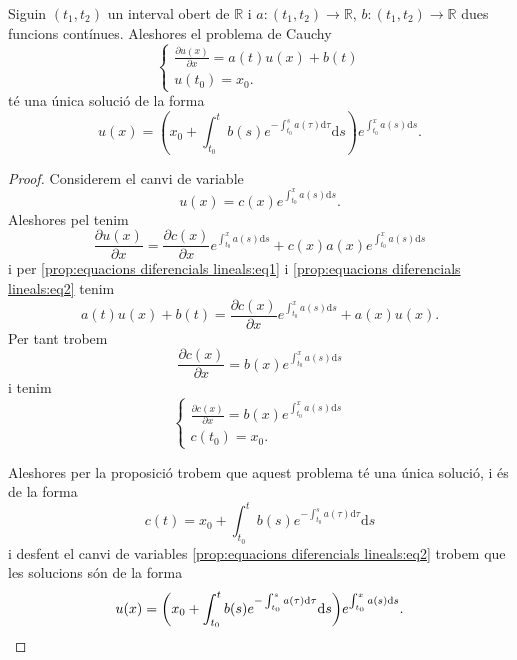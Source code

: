 \documentclass[../Apunts.tex]{subfiles}
\begin{document}
	\begin{proposition}
		\label{prop:equacions diferencials lineals}
		Siguin \((t_{1},t_{2})\) un interval obert de \(\mathbb{R}\) i \(a\colon(t_{1},t_{2})\longrightarrow\mathbb{R}\), \(b\colon(t_{1},t_{2})\longrightarrow\mathbb{R}\) dues funcions contínues. Aleshores el problema de Cauchy
		\begin{equation}
			\label{prop:equacions diferencials lineals:eq1}
			\begin{cases}
				\displaystyle \frac{\partial u(x)}{\partial x}=a(t)u(x)+b(t)\\
				\displaystyle u(t_{0})=x_{0}.
			\end{cases}
		\end{equation}
		té una única solució de la forma
		\[u(x)=\left(x_{0}+\int_{t_{0}}^{t}b(s)e^{-\int_{t_{0}}^{s}a(\tau)\text{d}\tau}\text{d}s\right)e^{\int_{t_{0}}^{x}a(s)\text{d}s}.\]
		\begin{proof}
			Considerem el canvi de variable
			\begin{equation}
				\label{prop:equacions diferencials lineals:eq2}
				u(x)=c(x)e^{\int_{t_{0}}^{x}a(s)\text{d}s}.
			\end{equation}
			Aleshores pel  tenim %
			\[\frac{\partial u(x)}{\partial x}=\frac{\partial c(x)}{\partial x}e^{\int_{t_{0}}^{x}a(s)\text{d}s}+c(x)a(x)e^{\int_{t_{0}}^{x}a(s)\text{d}s}\]
			i per \eqref{prop:equacions diferencials lineals:eq1} i \eqref{prop:equacions diferencials lineals:eq2} tenim
			\[a(t)u(x)+b(t)=\frac{\partial c(x)}{\partial x}e^{\int_{t_{0}}^{x}a(s)\text{d}s}+a(x)u(x).\]
			Per tant trobem
			\[\frac{\partial c(x)}{\partial x}=b(x)e^{\int_{t_{0}}^{x}a(s)\text{d}s}\]
			i tenim
			\begin{equation}
				\label{prop:equacions diferencials lineals:eq3}
				\begin{cases}
					\displaystyle \frac{\partial c(x)}{\partial x}=b(x)e^{\int_{t_{0}}^{x}a(s)\text{d}s}\\
					\displaystyle c(t_{0})=x_{0}.
				\end{cases}
			\end{equation}
			
			Aleshores per la proposició  trobem que aquest problema té una única solució, i és de la forma
			\[c(t)=x_{0}+\int_{t_{0}}^{t}b(s)e^{-\int_{t_{0}}^{s}a(\tau)\text{d}\tau}\text{d}s\]
			i desfent el canvi de variables \eqref{prop:equacions diferencials lineals:eq2} trobem que les solucions són de la forma
			\[u(x)=\left(x_{0}+\int_{t_{0}}^{t}b(s)e^{-\int_{t_{0}}^{s}a(\tau)\text{d}\tau}\text{d}s\right)e^{\int_{t_{0}}^{x}a(s)\text{d}s}.\qedhere\]
		\end{proof}
	\end{proposition}
\end{document}
